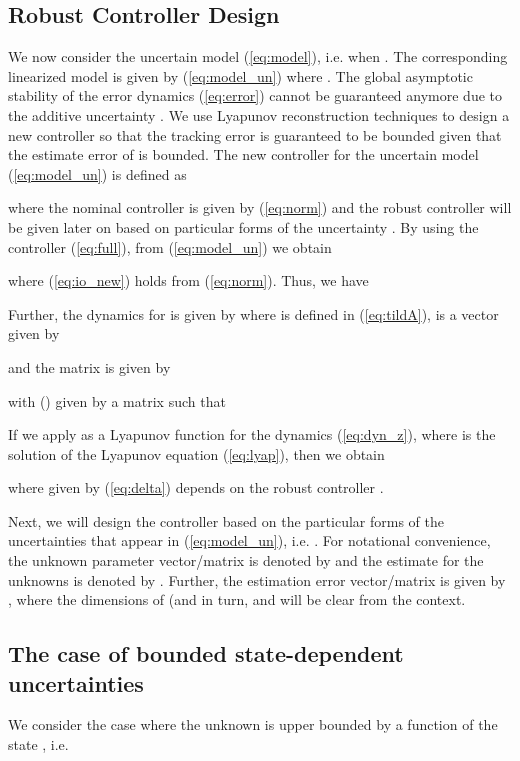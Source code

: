 \documentclass[twoside,leqno,onecolumn]{article}
\begin{document}
\subsection{Robust Controller Design} \label{sec:robust} We now
consider the uncertain model (\ref{eq:model}), i.e. when . The corresponding linearized model is given by
(\ref{eq:model_un}) where . The global
asymptotic stability of the error dynamics (\ref{eq:error}) cannot
be guaranteed anymore due to the additive uncertainty . We use Lyapunov reconstruction techniques to design a
new controller so that the tracking error is guaranteed to be
bounded given that the estimate error of  is
bounded. The new controller for the uncertain model
(\ref{eq:model_un}) is defined as

where the nominal controller  is given by (\ref{eq:norm})
and the robust controller  will be given later on based on
particular forms of the uncertainty . By using
the controller (\ref{eq:full}), from (\ref{eq:model_un}) we obtain

where (\ref{eq:io_new}) holds from (\ref{eq:norm}). Thus, we have

Further, the dynamics for  is given by
where  is defined in (\ref{eq:tildA}),  is a  vector given by

and the matrix  is given by

with  () given by a  matrix such that

If we apply  as a Lyapunov function for the dynamics
(\ref{eq:dyn_z}), where  is the solution of the Lyapunov
equation (\ref{eq:lyap}), then we obtain

where  given by (\ref{eq:delta}) depends on the robust controller .

Next, we will design the controller  based on the
particular forms of the uncertainties that appear in
(\ref{eq:model_un}), i.e. . For notational
convenience, the unknown parameter vector/matrix is denoted by
 and the estimate for the unknowns is denoted by
. Further, the estimation error vector/matrix
is given by , where the
dimensions of  (and in turn,  and
 will be clear from the context.






\subsection{The case of bounded state-dependent uncertainties}
\label{sec:case2} We consider the case where the unknown  is upper bounded by a function of the state
, i.e.
\end{document}
